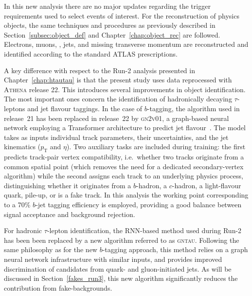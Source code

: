 In this new analysis there are no major updates regarding the trigger requirements used to select events of interest. For the reconstruction of physics objects, the same techniques and procedures as previously described in Section~\ref{subsec:object_def} and Chapter~\ref{chap:object_rec} are followed. Electrons, muons, \tauhadvis, jets, and missing transverse momentum are reconstructed and identified according to the standard ATLAS prescriptions.

A key difference with respect to the Run-2 analysis presented in Chapter~\ref{chap:htautau} is that the present study uses data reprocessed with \textsc{Athena} release 22. This introduces several improvements in object identification. The most important ones concern the identification of hadronically decaying $\tau$-leptons and jet flavour taggings. In the case of $b$-tagging, the algorithm used in release~21 has been replaced in release~22 by \textsc{gn2v01}, a graph-based neural network employing a Transformer architecture to predict jet flavour~\cite{new_tagging}. The model takes as inputs individual track parameters, their uncertainties, and the jet kinematics ($p_{\mathrm{T}}$ and $\eta$). Two auxiliary tasks are included during training: the first predicts track-pair vertex compatibility, i.e.\ whether two tracks originate from a common spatial point (which removes the need for a dedicated secondary-vertex algorithm) while the second assigns each track to an underlying physics process, distinguishing whether it originates from a $b$-hadron, a $c$-hadron, a light-flavour quark, pile-up, or is a fake track. In this analysis the working point corresponding to a 70\% $b$-jet tagging efficiency is employed, providing a good balance between signal acceptance and background rejection. 

For hadronic $\tau$-lepton identification, the RNN-based method used during Run-2 has been been replaced by a new algorithm referred to as \textsc{gntau}. Following the same philosophy as for the new $b$-tagging approach, this method relies on a graph neural network infrastructure with similar inputs, and provides improved discrimination of \tauhadvis candidates from quark- and gluon-initiated jets. As will be discussed in Section~\ref{fakes_run3}, this new algorithm significantly reduces the contribution from fake-\tauhad backgrounds.

